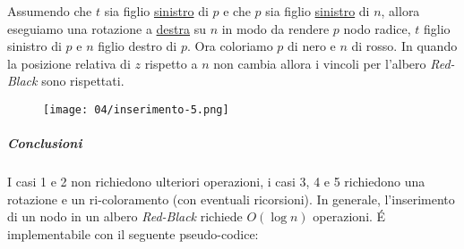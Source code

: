                     Assumendo che $ t $ sia figlio \underline{sinistro} di $ p $ e che $ p $ sia figlio \underline{sinistro} di $ n $, allora eseguiamo una rotazione a \underline{destra} su $ n $ in modo da rendere $ p $ nodo radice, $ t $ figlio sinistro di $ p $ e $ n $ figlio destro di $ p $. Ora coloriamo $ p $ di nero e $ n $ di rosso. In quando la posizione relativa di $ z $ rispetto a $ n $ non cambia allora i vincoli per l'albero \textit{Red-Black} sono rispettati.
                    \begin{figure}[H]
                        \centering
                        \texttt{[image: 04/inserimento-5.png]}
                    \end{figure}
                \subparagraph{Conclusioni}
                    I casi 1 e 2 non richiedono ulteriori operazioni, i casi 3, 4 e 5 richiedono una rotazione e un ri-coloramento (con eventuali ricorsioni). In generale, l'inserimento di un nodo in un albero \textit{Red-Black} richiede $O(\log n)$ operazioni. É implementabile con il seguente pseudo-codice:
                    \newpage
